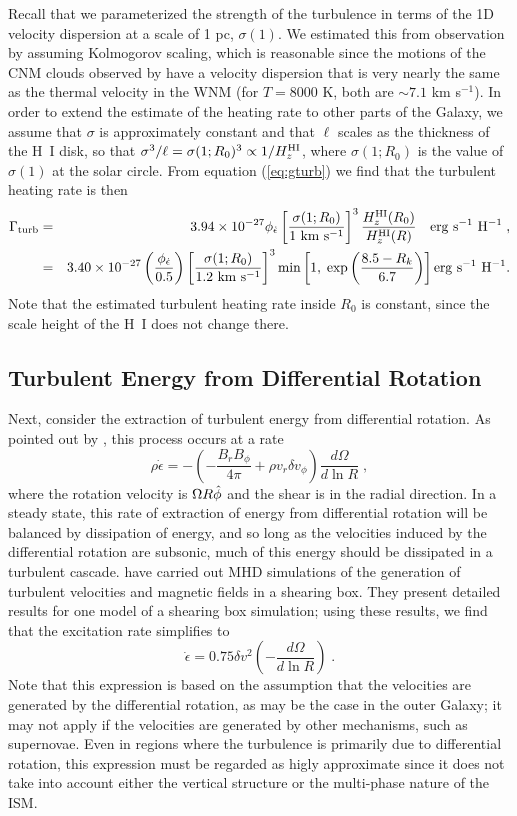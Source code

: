 \documentclass[12pt,preprint,flushrt]{aastex}
\newcommand{\beq}{\begin{equation}}
\newcommand{\eeq}{\end{equation}}
\newcommand{\e}{$^{-1}$}
\newcommand{\phied}{\phi_{{\dot\epsilon}}}
\newcommand{\gturb}{\Gamma_{\rm turb}}
\begin{document}
      Recall that we parameterized the strength of the turbulence
in terms of the 1D velocity dispersion at a scale of
1 pc, $\sigma(1)$.  We estimated this from observation
by assuming Kolmogorov scaling, which is reasonable
since the motions of the CNM clouds observed by
\cite{hei02}  have a velocity dispersion
that is very nearly the same as the thermal velocity
in the WNM (for $T=8000$ K, both are $\sim 7.1$ km s\e).
In order to extend the estimate of the heating rate to
other parts of the Galaxy, we assume that $\sigma$ is approximately
constant and that $\ell$ scales as the thickness of the H~I disk,
so that $\sigma^3/\ell=\sigma(1;R_0)^3\propto 1/H_z^{\rm HI}$,
where $\sigma(1;R_0)$ is the value of $\sigma(1)$ at the solar
circle.
From equation (\ref{eq:gturb}) we find that
the turbulent heating rate is then
\begin{eqnarray}
\gturb & = & 3.94\times 10^{-27}\phied\left[\frac{\sigma(1;R_0)}{1\
       {\rm km\ s^{-1}}}\right]^3\frac{H_z^{\rm HI}(R_0)}{H_z^{\rm HI}(R)}
       ~~~{\rm erg~s^{-1}~H^{-1}}\; ,\\
       & = & 3.40\times 10^{-27}\left(\frac{\phied}{0.5}\right)
        \left[\frac{\sigma(1;R_0)}{1.2~{\rm km\ s^{-1}}}\right]^3
        {\rm min}\left[1,\;\exp\left(\frac{8.5-R_k}{6.7}\right)\right]
        {\rm erg~s^{-1}~H^{-1}}.
\label{eq:gturb1}
\end{eqnarray}
Note that the estimated turbulent heating rate inside $R_0$
is constant, since
the scale height of the H~I does not change there.

\subsection{Turbulent Energy from Differential Rotation}

    Next, consider the extraction of turbulent energy from
differential rotation.  As pointed out by \cite{sel99},
this process occurs
at a rate
\beq
\rho\dot\epsilon=-\left(-\frac{B_rB_\phi}{4\pi}+\rho v_r\delta v_\phi
        \right)\frac{d\Omega}{d\ln R}\; ,
\eeq
where the rotation velocity is $\Omega R \hat{\bf\phi}$
and the shear is in the radial direction.
In a steady state, this rate of extraction of energy from
differential rotation will be balanced by dissipation of
energy, and so long as the velocities induced by the
differential rotation are subsonic, much of this energy
should be dissipated in a turbulent cascade. \cite{haw95}
have carried out MHD simulations of the generation of
turbulent velocities and magnetic fields in a shearing box.
They present
detailed results for one model of a shearing box simulation;
using these results, we find that the excitation
rate simplifies to
\beq
\dot\epsilon =  0.75\delta v^2\left(-\frac{d\Omega}{d\ln R}\right)\; .
\eeq
Note that this expression is based on the assumption that
the velocities are generated by the differential rotation,
as may be the case in the outer Galaxy; it may not apply if
the velocities are generated by other mechanisms, such
as supernovae.  Even in regions where the turbulence is
primarily due to differential rotation, this expression must
be regarded as higly approximate since it does not take into
account either the vertical structure or the multi-phase nature
of the ISM.
\end{document}
